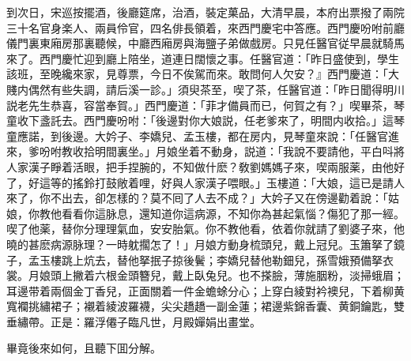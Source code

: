 到次日，宋巡按擺酒，後廳筵席，治酒，裝定菓品，大清早晨，本府出票撥了兩院三十名官身楽人、兩員伶官，四名俳長領着，來西門慶宅中答應。西門慶吩咐前廳儀門裏東廂房那裏聽候，中廳西廂房與海鹽子弟做戲房。只見任醫官従早晨就騎馬來了。西門慶忙迎到廳上陪坐，道連日闊懷之事。任醫官道：「昨日盛使到，學生該班，至晚纔來家，見尊票，今日不俟駕而來。敢問何人欠安？』西門慶道：「大賤内偶然有些失調，請后溪一診。」須臾茶至，喫了茶，任醫官道：「昨日聞得明川説老先生恭喜，容當奉賀。」西門慶道：「菲才備員而已，何賀之有？」喫畢茶，琴童收下盞託去。西門慶吩咐：「後邊對你大娘説，任老爹來了，明間内收拾。」這琴童應諾，到後邊。大妗子、李嬌兒、孟玉樓，都在房内，見琴童來說：「任醫官進來，爹吩咐教收拾明間裏坐。」月娘坐着不動身，説道：「我說不要請他，平白呌將人家漢子睜着活眼，把手捏腕的，不知做什麽？敎劉媽媽子來，喫兩服薬，由他好了，好這等的搖鈴打鼓敞着哩，好與人家漢子喂眼。」玉樓道：「大娘，這已是請人來了，你不出去，卻怎樣的？莫不囘了人去不成？」大妗子又在傍邊勸着說：「姑娘，你教他看看你這脉息，還知道你這病源，不知你為甚起氣惱？傷犯了那一經。喫了他薬，替你分理理氣血，安安胎氣。你不教他看，依着你就請了劉婆子來，他曉的甚麽病源脉理？一時躭擱怎了！」月娘方動身梳頭兒，戴上冠兒。玉簫拏了鏡子，孟玉樓跳上炕去，替他拏抿子掠後鬢；李嬌兒替他勒鈿兒，孫雪娥預備拏衣裳。月娘頭上撇着六根金頭簪兒，戴上臥兔兒。也不搽臉，薄施胭粉，淡掃蛾眉；耳邊带着兩個金丁香兒，正面關着一件金蟾蜍分心；上穿白綾對衿襖兒，下着柳黄寬襴挑繡裙子；襯着綾波羅襪，尖尖趫趫一副金蓮；裙邊紫錦香囊、黄銅鑰匙，雙垂繡帶。正是：羅浮僊子臨凡世，月殿嬋娟出畫堂。

畢竟後來如何，且聽下囬分解。

